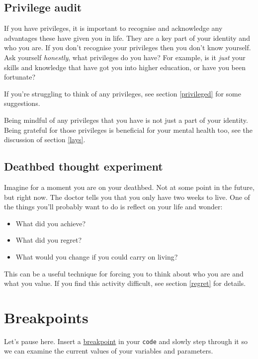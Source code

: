 \documentclass[
]{book}
\providecommand{\tightlist}{%
  \setlength{\itemsep}{0pt}\setlength{\parskip}{0pt}}
\begin{document}
\hypertarget{apriv}{%
\subsection{Privilege audit}\label{apriv}}

If you have privileges, it is important to recognise and acknowledge any advantages these have given you in life. They are a key part of your identity and who you are. If you don't recognise your privileges then you don't know yourself. Ask yourself \emph{honestly}, what privileges do you have? For example, is it \emph{just} your skills and knowledge that have got you into higher education, or have you been fortunate?

If you're struggling to think of any privileges, see section \ref{privileged} for some suggestions.

Being mindful of any privileges that you have is not just a part of your identity. Being grateful for those privileges is beneficial for your mental health too, see the discussion of section \ref{lays}.

\hypertarget{regrets}{%
\subsection{Deathbed thought experiment}\label{regrets}}

Imagine for a moment you are on your deathbed. Not at some point in the future, but right now. The doctor tells you that you only have two weeks to live. One of the things you'll probably want to do is reflect on your life and wonder:

\begin{itemize}
\tightlist
\item
  What did you achieve?
\item
  What did you regret?
\item
  What would you change if you could carry on living?
\end{itemize}

This can be a useful technique for forcing you to think about who you are and what you value. If you find this activity difficult, see section \ref{regret} for details.

\hypertarget{bp2}{%
\section{Breakpoints}\label{bp2}}

Let's pause here. Insert a \href{https://en.wikipedia.org/wiki/Breakpoint}{breakpoint} in your \texttt{code} and slowly step through it so we can examine the current values of your variables and parameters.
\end{document}
